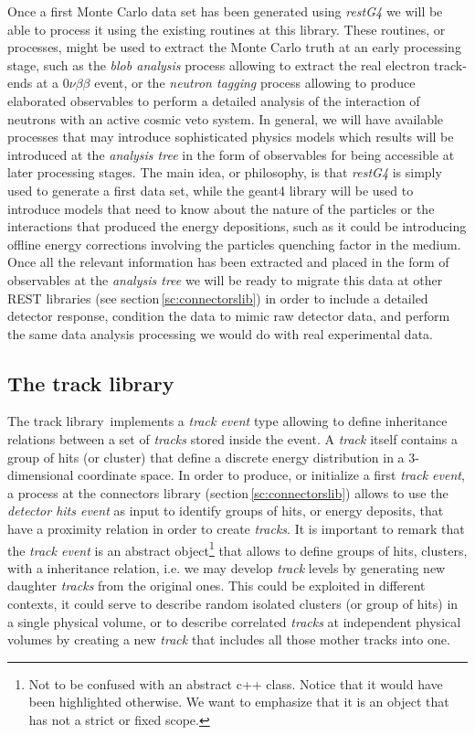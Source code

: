 Once a first Monte Carlo data set has been generated using \emph{restG4} we will be able to process it using the existing routines at this library. These routines, or processes, might be used to extract the Monte Carlo truth at an early processing stage, such as the \emph{blob analysis} process allowing to extract the real electron track-ends at a $0\nu\beta\beta$ event, or the \emph{neutron tagging} process allowing to produce elaborated observables to perform a detailed analysis of the interaction of neutrons with an active cosmic veto system. In general, we will have available processes that may introduce sophisticated physics models which results will be introduced at the \emph{analysis tree} in the form of observables for being accessible at later processing stages. The main idea, or philosophy, is that \emph{restG4} is simply used to generate a first data set, while the geant4 library will be used to introduce models that need to know about the nature of the particles or the interactions that produced the energy depositions, such as it could be introducing offline energy corrections involving the particles quenching factor in the medium. Once all the relevant information has been extracted and placed in the form of observables at the \emph{analysis tree} we will be ready to migrate this data at other REST libraries (see section\,\ref{sc:connectorslib}) in order to include a detailed detector response, condition the data to mimic raw detector data, and perform the same data analysis processing we would do with real experimental data.

\subsection{The track library}\label{sc:tracklib}

The track library\,\cite{REST_Track_Git} implements a \emph{track event} type allowing to define inheritance relations between a set of \emph{tracks} stored inside the event. A \emph{track} itself contains a group of hits (or cluster) that define a discrete energy distribution in a 3-dimensional coordinate space. In order to produce, or initialize a first \emph{track event}, a process at the connectors library (section\,\ref{sc:connectorslib}) allows to use the \emph{detector hits event} as input to identify groups of hits, or energy deposits, that have a proximity relation in order to create \emph{tracks}. It is important to remark that the \emph{track event} is an abstract object\footnote{Not to be confused with an abstract c++ class. Notice that it would have been highlighted otherwise. We want to emphasize that it is an object that has not a strict or fixed scope.} that allows to define groups of hits, clusters, with a inheritance relation, i.e. we may develop \emph{track} levels by generating new daughter \emph{tracks} from the original ones. This could be exploited in different contexts, it could serve to describe random isolated clusters (or group of hits) in a single physical volume, or to describe correlated \emph{tracks} at independent physical volumes by creating a new \emph{track} that includes all those mother tracks into one.

